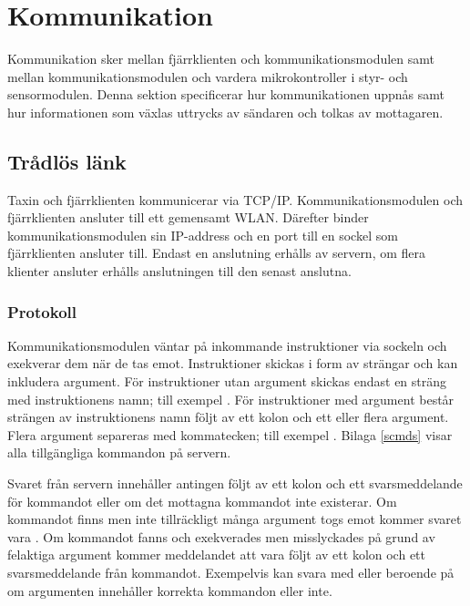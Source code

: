 \documentclass[tekniskrapport/tech.tex]{subfiles}
\begin{document}
\section{Kommunikation}
Kommunikation sker mellan fjärrklienten och kommunikationsmodulen samt mellan
kommunikationsmodulen och vardera mikrokontroller i styr- och sensormodulen.
Denna sektion specificerar hur kommunikationen uppnås samt hur informationen
som växlas uttrycks av sändaren och tolkas av mottagaren.

\subsection{Trådlös länk}
Taxin och fjärrklienten kommunicerar via TCP/IP. Kommunikationsmodulen och
fjärrklienten ansluter till ett gemensamt WLAN. Därefter binder
kommunikationsmodulen sin IP-address och en port till en sockel som
fjärrklienten ansluter till. Endast en anslutning erhålls av servern, om flera
klienter ansluter erhålls anslutningen till den senast anslutna.

\subsubsection{Protokoll}
\label{sec:wlproto}
Kommunikationsmodulen väntar på inkommande instruktioner via sockeln och
exekverar dem när de tas emot. Instruktioner skickas i form av strängar och kan
inkludera argument. För instruktioner utan argument skickas endast en sträng
med instruktionens namn; till exempel . För instruktioner med
argument består strängen av instruktionens namn följt av ett kolon och ett
eller flera argument. Flera argument separeras med kommatecken; till exempel
. Bilaga \ref{scmds} visar
alla tillgängliga kommandon på servern.

Svaret från servern innehåller antingen  följt av ett kolon och
ett svarsmeddelande för kommandot eller  om det mottagna
kommandot inte existerar. Om kommandot finns men inte tillräckligt många
argument togs emot kommer svaret vara . Om kommandot fanns
och exekverades men misslyckades på grund av felaktiga argument kommer
meddelandet att vara  följt av ett kolon och ett svarsmeddelande
från kommandot. Exempelvis kan  svara med  eller  beroende på om argumenten innehåller
korrekta kommandon eller inte.
\end{document}
